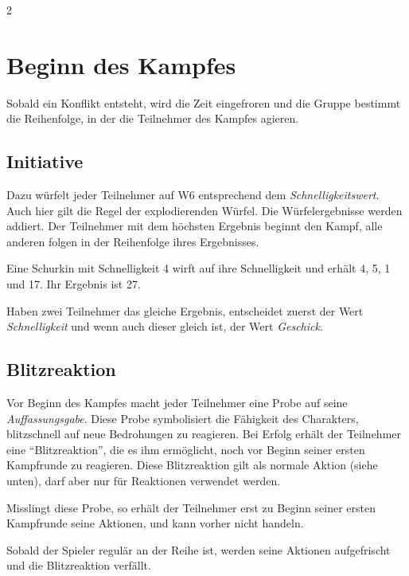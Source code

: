 \label{ch:combat}

\begin{multicols}{2}

\section{Beginn des Kampfes}

Sobald ein Konflikt entsteht, wird die Zeit eingefroren und die Gruppe bestimmt die Reihenfolge, in der die Teilnehmer des Kampfes agieren.

\subsection{Initiative}

Dazu würfelt jeder Teilnehmer auf W6 entsprechend dem \textit{Schnelligkeitswert}. Auch hier gilt die Regel der explodierenden Würfel. Die Würfelergebnisse werden addiert. Der Teilnehmer mit dem höchsten Ergebnis beginnt den Kampf, alle anderen folgen in der Reihenfolge ihres Ergebnisses.

\begin{pexample}[Beispiel]
Eine Schurkin mit Schnelligkeit 4 wirft auf ihre Schnelligkeit und erhält 4, 5, 1 und 17. Ihr Ergebnis ist 27.
\end{pexample}

Haben zwei Teilnehmer das gleiche Ergebnis, entscheidet zuerst der Wert \textit{Schnelligkeit} und wenn auch dieser gleich ist, der Wert \textit{Geschick}.

\subsection{Blitzreaktion}

Vor Beginn des Kampfes macht jeder Teilnehmer eine Probe auf seine \textit{Auffassungsgabe}. Diese Probe symbolisiert die Fähigkeit des Charakters, blitzschnell auf neue Bedrohungen zu reagieren. Bei Erfolg erhält der Teilnehmer eine ``Blitzreaktion'', die es ihm ermöglicht, noch vor Beginn seiner ersten Kampfrunde zu reagieren. Diese Blitzreaktion gilt als normale Aktion (siehe unten), darf aber nur für Reaktionen verwendet werden.

Misslingt diese Probe, so erhält der Teilnehmer erst zu Beginn seiner ersten Kampfrunde seine Aktionen, und kann vorher nicht handeln.

Sobald der Spieler regulär an der Reihe ist, werden seine Aktionen aufgefrischt und die Blitzreaktion verfällt.


\end{multicols}
